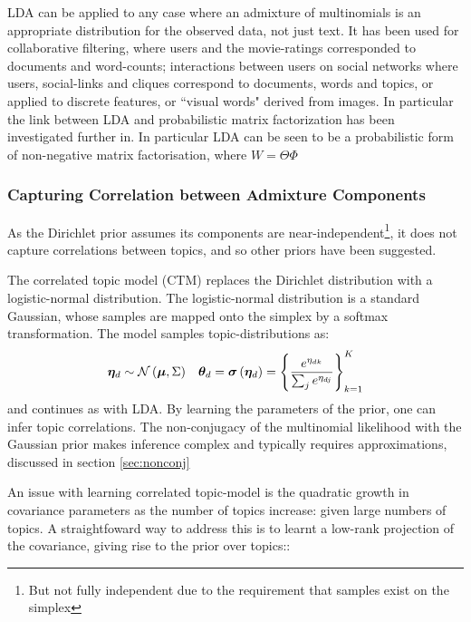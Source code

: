 LDA can be applied to any case where an admixture of multinomials is an appropriate distribution for the observed data, not just text. It has been used for collaborative filtering\cite{BleiNgJordan2003}, where users and the movie-ratings corresponded to documents and word-counts; interactions between users on social networks where users, social-links and cliques correspond to documents, words and topics\cite{Zhang2007}, or applied to discrete features, or ``visual words" derived from images\cite{Philbin2008}. In particular the link between LDA and probabilistic matrix factorization\cite{Salakhutdinov2007} has been investigated further in\cite{Agarwal2010}. In particular LDA can be seen to be a probabilistic form of non-negative matrix factorisation\cite{Lin2007}, where $W = \Theta \Phi$


\subsubsection{Capturing Correlation between Admixture Components}

As the Dirichlet prior assumes its components are near-independent\footnote{But not fully independent due to the requirement that samples exist on the simplex}, it does not capture correlations between topics, and so other priors have been suggested.

The correlated topic model\cite{Blei2006} (CTM) replaces the Dirichlet distribution with a logistic-normal distribution.  The logistic-normal distribution is a standard Gaussian, whose samples are mapped onto the simplex by a softmax transformation. The model samples topic-distributions as:
\begin{align}
\bm \eta_d & \sim \mathcal{N} \left( {\bm \mu}, {\Sigma} \right) & { \bm \theta_d } = \bm \sigma\left(\bm \eta_d\right) = \left\{\frac{e^{\eta_{dk}}}{\sum_j e^{\eta_{dj}}}\right\}_{k=1}^K
\end{align}
and continues as with LDA. By learning the parameters of the prior, one can infer topic correlations. The non-conjugacy of the multinomial likelihood with the Gaussian prior makes inference complex and typically requires approximations, discussed in section \ref{sec:nonconj}

An issue with learning correlated topic-model is the quadratic growth in covariance parameters as the number of topics increase: given large numbers of topics. A straightfoward way to address this is to learnt a low-rank projection of the covariance, giving rise to the prior over topics:\cite{Putthividhya2009}:

